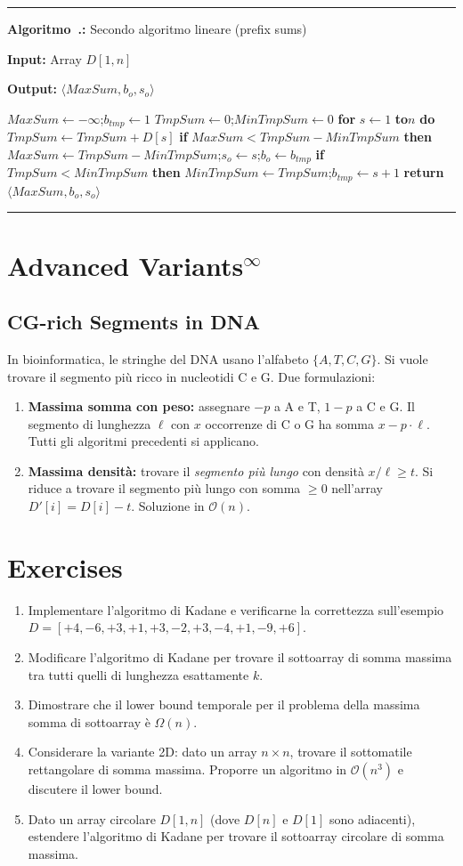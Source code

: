 \documentclass[12pt, a4paper, oneside]{book}
\newcounter{algocf}[chapter]
\renewcommand{\thealgocf}{\thechapter.\arabic{algocf}}
\newenvironment{algorithm}[1][H]{%
  \refstepcounter{algocf}%
  \par\medskip\noindent\rule{\linewidth}{0.4pt}\par\smallskip
}{%
  \par\smallskip\noindent\rule{\linewidth}{0.4pt}\par\medskip
}
\newcommand{\algcaption}[1]{\noindent\textbf{Algoritmo~\thealgocf:} #1\par\smallskip}
\newcommand{\KwIn}[1]{\noindent\textbf{Input:} #1\par}
\newcommand{\KwOut}[1]{\noindent\textbf{Output:} #1\par}
\newcommand{\For}[1]{\noindent\textbf{for} #1 \textbf{do}}
\newcommand{\If}[1]{\noindent\textbf{if} #1 \textbf{then}}
\newcommand{\Return}[1]{\noindent\textbf{return} #1}
\newcommand{\KwTo}{\textbf{to}}
\theoremstyle{plain}
\theoremstyle{definition}
\theoremstyle{remark}
\newcommand{\OO}[1]{\mathcal{O}\!\left(#1\right)}
\newcommand{\Om}[1]{\Omega\!\left(#1\right)}
\begin{document}
\begin{algorithm}[H]
\algcaption{Secondo algoritmo lineare (prefix sums)}
\KwIn{Array $D[1,n]$}
\KwOut{$\langle MaxSum, b_o, s_o \rangle$}
$MaxSum \leftarrow -\infty$;\quad $b_{tmp} \leftarrow 1$\;
$TmpSum \leftarrow 0$;\quad $MinTmpSum \leftarrow 0$\;
\For{$s \leftarrow 1$ \KwTo $n$}{
  $TmpSum \leftarrow TmpSum + D[s]$\;
  \If{$MaxSum < TmpSum - MinTmpSum$}{
    $MaxSum \leftarrow TmpSum - MinTmpSum$;\quad $s_o \leftarrow s$;\quad $b_o \leftarrow b_{tmp}$\;
  }
  \If{$TmpSum < MinTmpSum$}{
    $MinTmpSum \leftarrow TmpSum$;\quad $b_{tmp} \leftarrow s + 1$\;
  }
}
\Return{$\langle MaxSum, b_o, s_o \rangle$}\;
\end{algorithm}

\section{Advanced Variants$^\infty$}

\subsection{CG-rich Segments in DNA}
In bioinformatica, le stringhe del DNA usano l'alfabeto $\{A, T, C, G\}$. Si vuole trovare il segmento più ricco in nucleotidi C e G. Due formulazioni:
\begin{enumerate}
  \item \textbf{Massima somma con peso:} assegnare $-p$ a A e T, $1-p$ a C e G. Il segmento di lunghezza $\ell$ con $x$ occorrenze di C o G ha somma $x - p \cdot \ell$. Tutti gli algoritmi precedenti si applicano.
  \item \textbf{Massima densità:} trovare il \emph{segmento più lungo} con densità $x/\ell \ge t$. Si riduce a trovare il segmento più lungo con somma $\ge 0$ nell'array $D'[i] = D[i] - t$. Soluzione in $\OO{n}$.
\end{enumerate}

\section{Exercises}

\begin{enumerate}
  \item Implementare l'algoritmo di Kadane e verificarne la correttezza sull'esempio $D = [+4,-6,+3,+1,+3,-2,+3,-4,+1,-9,+6]$.
  \item Modificare l'algoritmo di Kadane per trovare il sottoarray di somma massima tra tutti quelli di lunghezza esattamente $k$.
  \item Dimostrare che il lower bound temporale per il problema della massima somma di sottoarray è $\Om{n}$.
  \item Considerare la variante 2D: dato un array $n \times n$, trovare il sottomatile rettangolare di somma massima. Proporre un algoritmo in $\OO{n^3}$ e discutere il lower bound.
  \item Dato un array circolare $D[1,n]$ (dove $D[n]$ e $D[1]$ sono adiacenti), estendere l'algoritmo di Kadane per trovare il sottoarray circolare di somma massima.
\end{enumerate}
\end{document}
